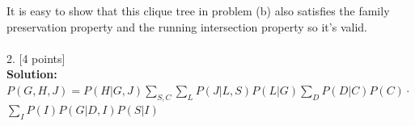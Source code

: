 \documentclass[letterpaper, 11pt]{article}
\begin{document}
It is easy to show that this clique tree in problem (b) also satisfies the family preservation property and the running intersection property so it's valid.\\
\\
\noindent
\large 2. [4 points]\\
\textbf{Solution:}\\
$P(G,H,J) = P(H|G,J)\sum_{S,C} \sum_{L} P(J|L,S)P(L|G) \sum_{D} P(D|C)P(C) \cdot $ \\
$ \sum_I P(I)P(G|D,I)P(S|I)$
\end{document}

